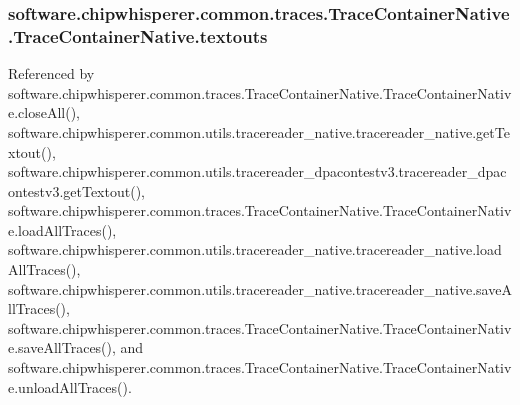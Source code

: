 \hypertarget{classsoftware_1_1chipwhisperer_1_1common_1_1traces_1_1TraceContainerNative_1_1TraceContainerNative_ab888dccf7cf544c0202c89daf2606685}{}
\subsubsection[{textouts}]{\setlength{\rightskip}{0pt plus 5cm}software.\+chipwhisperer.\+common.\+traces.\+Trace\+Container\+Native.\+Trace\+Container\+Native.\+textouts}\label{classsoftware_1_1chipwhisperer_1_1common_1_1traces_1_1TraceContainerNative_1_1TraceContainerNative_ab888dccf7cf544c0202c89daf2606685}


Referenced by software.\+chipwhisperer.\+common.\+traces.\+Trace\+Container\+Native.\+Trace\+Container\+Native.\+close\+All(), software.\+chipwhisperer.\+common.\+utils.\+tracereader\+\_\+native.\+tracereader\+\_\+native.\+get\+Textout(), software.\+chipwhisperer.\+common.\+utils.\+tracereader\+\_\+dpacontestv3.\+tracereader\+\_\+dpacontestv3.\+get\+Textout(), software.\+chipwhisperer.\+common.\+traces.\+Trace\+Container\+Native.\+Trace\+Container\+Native.\+load\+All\+Traces(), software.\+chipwhisperer.\+common.\+utils.\+tracereader\+\_\+native.\+tracereader\+\_\+native.\+load\+All\+Traces(), software.\+chipwhisperer.\+common.\+utils.\+tracereader\+\_\+native.\+tracereader\+\_\+native.\+save\+All\+Traces(), software.\+chipwhisperer.\+common.\+traces.\+Trace\+Container\+Native.\+Trace\+Container\+Native.\+save\+All\+Traces(), and software.\+chipwhisperer.\+common.\+traces.\+Trace\+Container\+Native.\+Trace\+Container\+Native.\+unload\+All\+Traces().

\hypertarget{classsoftware_1_1chipwhisperer_1_1common_1_1traces_1_1TraceContainerNative_1_1TraceContainerNative_a616fd2f435d14a2a3cc68b4892aad9eb}{}
